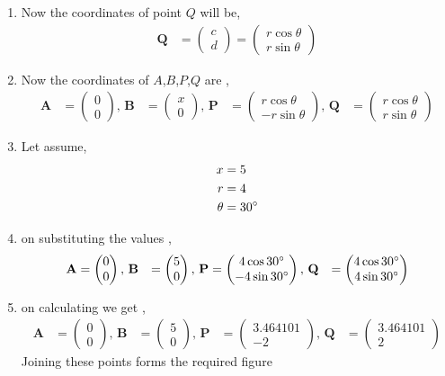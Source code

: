 \documentclass[11pt, a4paper]{article}
\newcommand{\myvec}[1]{\ensuremath{\begin{pmatrix}#1\end{pmatrix}}}
\let\vec\mathbf
\begin{document}
\begin{enumerate}
\begin{enumerate}
\item Now the coordinates of point $Q$ will be,
\begin{align}
\vec{Q} &= \myvec{ c \\ d } = \myvec{r \cos \theta \\ r \sin \theta} 
\end{align}

\item Now the coordinates of $A$,$B$,$P$,$Q$ are ,
\begin{align}
\vec{A} &= \myvec{0 \\ 0},\,
\vec{B} &= \myvec{x \\ 0} ,\,
\vec{P} &= \myvec{r \cos \theta \\ -r \sin \theta} ,\,
\vec{Q} &= \myvec{r \cos \theta \\ r \sin \theta} 
\end{align}

\item Let assume, 
\begin{align}
	x &= 5 \\
	r &=4 \\
	\theta &= 30 \degree
\end{align}

\item on substituting the values ,
\begin{align}
\vec{A} &= \myvec{0 \\ 0},\,
\vec{B} &= \myvec{5 \\ 0} ,\,
\vec{P} &= \myvec{4 \cos 30 \degree \\ -4 \sin 30 \degree } ,\,
\vec{Q} &= \myvec{4 \cos 30 \degree \\ 4 \sin 30 \degree } 
\end{align}

\item on calculating we get  ,
\begin{align}
\vec{A} &= \myvec{0 \\ 0},\,
\vec{B} &= \myvec{5 \\ 0} ,\,
\vec{P} &= \myvec{ 3.464101 \\ -2 } ,\,
\vec{Q} &= \myvec{3.464101  \\ 2 } 
\end{align}
Joining these points forms the required figure

\end{enumerate}
\end{enumerate}
\end{document}
